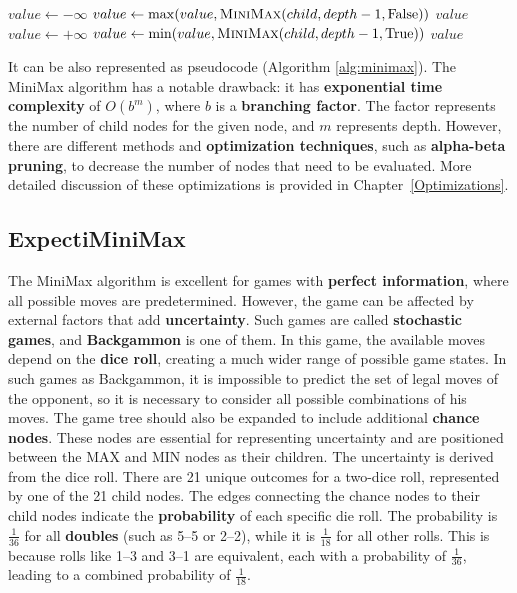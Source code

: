 \begin{algorithm}[H]
\caption{MiniMax Algorithm}\label{alg:minimax}
\begin{algorithmic}[1]
        \State \Return {}
    \EndIf
        \State $value \gets -\infty$
            \State $value \gets \max(value, \Call{MiniMax}{child, depth-1, \text{False}})$
        \EndFor
        \State \Return $value$
    \Else
        \State $value \gets +\infty$
            \State $value \gets \min(value, \Call{MiniMax}{child, depth-1, \text{True}})$
        \EndFor
        \State \Return $value$
    \EndIf
\EndFunction
\end{algorithmic}
\end{algorithm}

It can be also represented as pseudocode (Algorithm \ref{alg:minimax}). The MiniMax algorithm has a notable drawback: it has \textbf{exponential time complexity} of $O(b^m)$, where $b$ is a \textbf{branching factor}. The factor represents the number of child nodes for the given node, and $m$ represents depth. However, there are different methods and \textbf{optimization techniques}, such as \textbf{alpha-beta pruning}, to decrease the number of nodes that need to be evaluated. More detailed discussion of these optimizations is provided in Chapter~\ref{Optimizations}.

\subsection{ExpectiMiniMax}
The MiniMax algorithm is excellent for games with \textbf{perfect information}, where all possible moves are predetermined. However, the game can be affected by external factors that add \textbf{uncertainty}. Such games are called \textbf{stochastic games}, and \textbf{Backgammon} is one of them. In this game, the available moves depend on the \textbf{dice roll}, creating a much wider range of possible game states. In such games as Backgammon, it is impossible to predict the set of legal moves of the opponent, so it is necessary to consider all possible combinations of his moves. The game tree should also be expanded to include additional \textbf{chance nodes}. These nodes are essential for representing uncertainty and are positioned between the MAX and MIN nodes as their children. The uncertainty is derived from the dice roll. There are 21 unique outcomes for a two-dice roll, represented by one of the 21 child nodes. The edges connecting the chance nodes to their child nodes indicate the \textbf{probability} of each specific die roll. The probability is $\frac{1}{36}$ for all \textbf{doubles} (such as 5--5 or 2--2), while it is $\frac{1}{18}$ for all other rolls. This is because rolls like 1--3 and 3--1 are equivalent, each with a probability of $\frac{1}{36}$, leading to a combined probability of $\frac{1}{18}$.


